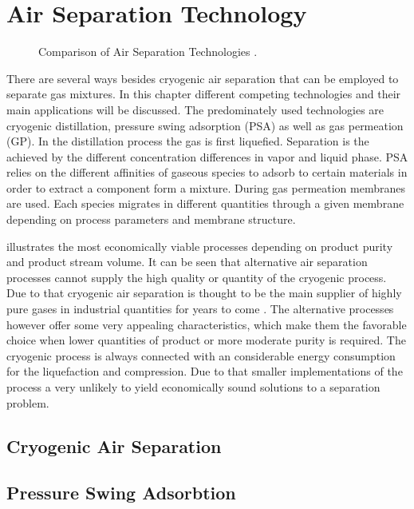 \chapter{Air Separation Technology}
\label{chp:airsep}
\begin{figure}[h]
	
	\caption{Comparison of Air Separation Technologies \cite{Prasad.1994}.}
	\label{fig:tech_compar}
\end{figure}

There are several ways besides cryogenic air separation that can be employed to separate gas mixtures. 
In this chapter different competing technologies and their main applications will be discussed. The 
predominately used technologies are cryogenic distillation, pressure swing adsorption (PSA) as well as 
gas permeation (GP). In the distillation process the gas is first liquefied. Separation is the achieved 
by the different concentration differences in vapor and liquid phase. PSA relies on the different affinities 
of gaseous species to adsorb to certain materials in order to extract a component form a mixture. During gas 
permeation membranes are used. Each species migrates in different quantities through a given membrane
depending on process parameters and membrane structure. 

 illustrates the most economically viable processes depending on product
purity and product stream volume. It can be seen that alternative air separation processes 
cannot supply the high quality or quantity of the cryogenic process. Due to that cryogenic air separation is 
thought to be the main supplier of highly pure gases in industrial quantities for years to come \cite{Zhu.2010}. 
The alternative processes however offer some very appealing characteristics, which make them the 
favorable choice when lower quantities of product or more moderate purity is required. The cryogenic 
process is always connected with an considerable energy consumption for the liquefaction and compression. 
Due to that smaller implementations of the process a very unlikely to yield economically sound solutions
to a separation problem. 

\addref

\section{Cryogenic Air Separation}
\label{sec:cryo_air_sep}

\section{Pressure Swing Adsorbtion}
\label{sec:psa}

